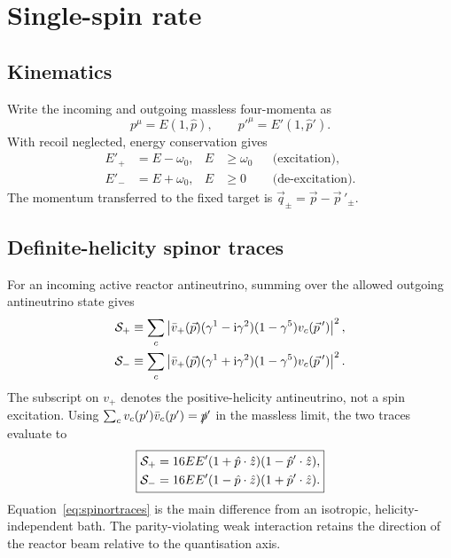 \documentclass[aps,prd,10pt,onecolumn,nofootinbib,amsmath,amssymb]{revtex4-1}
\begin{document}
\section{Single-spin rate}
\label{sec:single}

\subsection{Kinematics}

Write the incoming and outgoing massless four-momenta as
\begin{equation}
 p^\mu=E(1,\hat p),
\qquad
 p'^\mu=E'(1,\hat p').
\end{equation}
With recoil neglected, energy conservation gives
\begin{equation}
\begin{aligned}
 E'_+&=E-\omega_0,
 & E&\geq\omega_0
 &&\text{(excitation)},\\
 E'_-&=E+\omega_0,
 & E&\geq0
 &&\text{(de-excitation)}.
\end{aligned}
\label{eq:Epm}
\end{equation}
The momentum transferred to the fixed target is
\(\vec q_\pm=\vec p-\vec p\,'_\pm\).

\subsection{Definite-helicity spinor traces}

For an incoming active reactor antineutrino, summing over the allowed
outgoing antineutrino state gives
\begin{equation}
\begin{aligned}
 {\cal S}_+
 &\equiv
 \sum_c
 \left|
 \bar v_+(\vec p)
 (\gamma^1-{\rm i}\gamma^2)(1-\gamma^5)
 v_c(\vec p\,')
 \right|^2,\\
 {\cal S}_-
 &\equiv
 \sum_c
 \left|
 \bar v_+(\vec p)
 (\gamma^1+{\rm i}\gamma^2)(1-\gamma^5)
 v_c(\vec p\,')
 \right|^2 .
\end{aligned}
\label{eq:tracedef}
\end{equation}
The subscript on \(v_+\) denotes the positive-helicity antineutrino, not a
spin excitation.  Using
\(\sum_c v_c(p')\bar v_c(p')=\slashed p'\) in the massless limit, the two
traces evaluate to
\begin{equation}
\boxed{
\begin{aligned}
 {\cal S}_+
 &=16EE'(1+\hat p\cdot\hat z)
          (1-\hat p'\cdot\hat z),\\
 {\cal S}_-
 &=16EE'(1-\hat p\cdot\hat z)
          (1+\hat p'\cdot\hat z).
\end{aligned}}
\label{eq:spinortraces}
\end{equation}
Equation~\eqref{eq:spinortraces} is the main difference from an isotropic,
helicity-independent bath.  The parity-violating weak interaction retains
the direction of the reactor beam relative to the quantisation axis.
\end{document}
